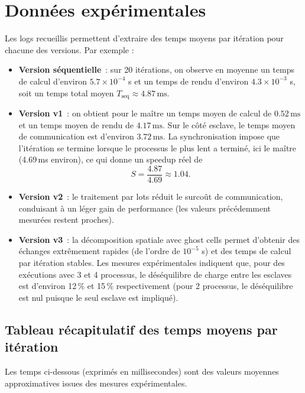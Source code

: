\documentclass[a4paper,13pt]{book}
\begin{document}
\section{Données expérimentales}

Les logs recueillis permettent d'extraire des temps moyens par itération pour chacune des versions. Par exemple :

\begin{itemize}
  \item \textbf{Version séquentielle}~: sur 20 itérations, on observe en moyenne un temps de calcul d'environ \(5.7 \times 10^{-4}\) s et un temps de rendu d'environ \(4.3 \times 10^{-3}\) s, soit un temps total moyen \(T_{\text{seq}} \approx 4.87\,\text{ms}\).
  \item \textbf{Version v1}~: on obtient pour le maître un temps moyen de calcul de \(0.52\,\text{ms}\) et un temps moyen de rendu de \(4.17\,\text{ms}\). Sur le côté esclave, le temps moyen de communication est d'environ \(3.72\,\text{ms}\). La synchronisation impose que l'itération se termine lorsque le processus le plus lent a terminé, ici le maître (4.69\,ms environ), ce qui donne un speedup réel de
  \[
    S = \frac{4.87}{4.69} \approx 1.04.
  \]
  \item \textbf{Version v2}~: le traitement par lots réduit le surcoût de communication, conduisant à un léger gain de performance (les valeurs précédemment mesurées restent proches).
  \item \textbf{Version v3}~: la décomposition spatiale avec ghost cells permet d'obtenir des échanges extrêmement rapides (de l'ordre de \(10^{-5}\) s) et des temps de calcul par itération stables. Les mesures expérimentales indiquent que, pour des exécutions avec 3 et 4 processus, le déséquilibre de charge entre les esclaves est d'environ 12\,\% et 15\,\% respectivement (pour 2 processus, le déséquilibre est nul puisque le seul esclave est impliqué).
\end{itemize}

\subsection{Tableau récapitulatif des temps moyens par itération}

Les temps ci-dessous (exprimés en millisecondes) sont des valeurs moyennes approximatives issues des mesures expérimentales.
\end{document}
